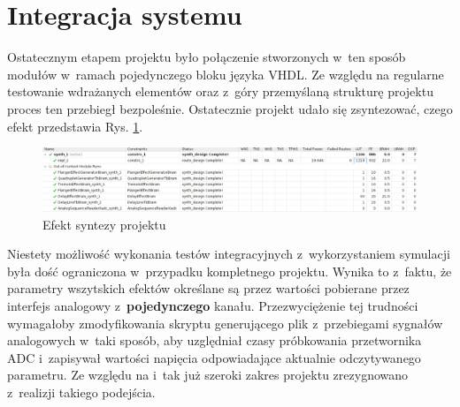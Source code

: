 \section{Integracja systemu}

Ostatecznym etapem projektu było połączenie stworzonych w~ten sposób modułów w~ramach pojedynczego bloku języka VHDL. Ze względu na regularne testowanie wdrażanych elementów oraz z~góry przemyślaną strukturę projektu proces ten przebiegł bezpoleśnie. Ostatecznie projekt udało się zsyntezować, czego efekt przedstawia Rys. \ref{synthesis}.

\vspace{1cm}
\begin{figure}[ht]
    \centering
    \includegraphics[width=\textwidth]{img/implementation.png}
    \captionsetup{format=plain,justification=centering}
    \caption{Efekt syntezy projektu}
    \label{synthesis}
\end{figure}
\vspace{1cm}

Niestety możliwość wykonania testów integracyjnych z~wykorzystaniem symulacji była dość ograniczona w~przypadku kompletnego projektu. Wynika to z~faktu, że parametry wszytskich efektów określane są przez wartości pobierane przez interfejs analogowy z~\textbf{pojedynczego} kanału. Przezwyciężenie tej trudności wymagałoby zmodyfikowania skryptu generującego plik z~przebiegami sygnałów analogowych w~taki sposób, aby uzględniał czasy próbkowania przetwornika ADC i~zapisywał wartości napięcia odpowiadające aktualnie odczytywanego parametru. Ze względu na i~tak już szeroki zakres projektu zrezygnowano z~realizji takiego podejścia.
